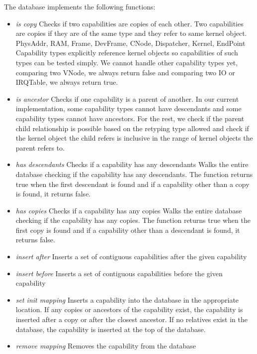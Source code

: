 \documentclass[a4paper,11pt,twoside]{report}
\begin{document}
The database implements the following functions:
\begin{itemize}
\item \emph{is copy} Checks if two capabilities are copies of each other.
  Two capabilities are copies if they are of the same type
  and they refer to same kernel object.
  PhysAddr, RAM, Frame, DevFrame, CNode, Dispatcher, Kernel, EndPoint
  Capability types explicitly reference kernel objects
  so capabilities of such types can be tested simply.
  We cannot handle other capability types yet,
  comparing two VNode, we always return false
  and comparing two IO or IRQTable, we always return true.

\item \emph{is ancestor} Checks if one capability is a parent of another.
  In our current implementation, some capability types cannot have descendants
  and some capability types cannot have ancestors.
  For the rest, we check if the parent child relationship is possible
  based on the retyping type allowed
  and check if the kernel object the child refers is inclusive
  in the range of kernel objects the parent refers to.

\item \emph{has descendants} Checks if a capability has any descendants
  Walks the entire database checking if the capability has any descendants.
  The function returns true when the first descendant is found
  and if a capability other than a copy is found, it returns false.

\item \emph{has copies} Checks if a capability has any copies
  Walks the entire database checking if the capability has any copies.
  The function returns true when the first copy is found
  and if a capability other than a descendant is found, it returns false.

\item \emph{insert after} Inserts a set of contiguous capabilities
  after the given capability

\item \emph{insert before} Inserts a set of contiguous capabilities
  before the given capability

\item \emph{set init mapping} Inserts a capability into the database
  in the appropriate location.
  If any copies or ancestors of the capability exist,
  the capability is inserted after a copy or after the closest ancestor.
  If no relatives exist in the database,
  the capability is inserted at the top of the database.

\item \emph{remove mapping} Removes the capability from the database
\end{itemize}
\end{document}

